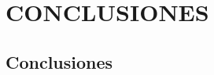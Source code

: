 \documentclass[spanish,12pt,a4paper,twoside,openright]{report}
\begin{document}
\chapter{CONCLUSIONES}
\section{Conclusiones}






\renewcommand*{\bibname}{REFERENCIAS}
\newpage



\appendix
\clearpage
\addappheadtotoc
\appendixpage
\setcounter{figure}{0} \renewcommand{\thefigure}{A.\arabic{figure}}
\setcounter{table}{0} \renewcommand{\thetable}{A.\arabic{table}}


\end{document}
